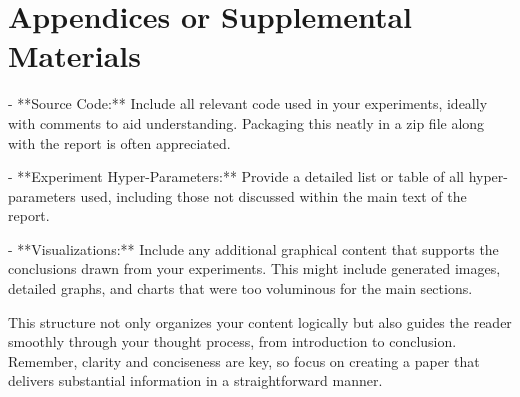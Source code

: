 \documentclass{article}
\begin{document}
\section{Appendices or Supplemental Materials}

- **Source Code:** Include all relevant code used in your experiments, ideally with comments to aid understanding. Packaging this neatly in a zip file along with the report is often appreciated.
  
- **Experiment Hyper-Parameters:** Provide a detailed list or table of all hyper-parameters used, including those not discussed within the main text of the report.

- **Visualizations:** Include any additional graphical content that supports the conclusions drawn from your experiments. This might include generated images, detailed graphs, and charts that were too voluminous for the main sections.

This structure not only organizes your content logically but also guides the reader smoothly through your thought process, from introduction to conclusion. Remember, clarity and conciseness are key, so focus on creating a paper that delivers substantial information in a straightforward manner.
\end{document}

